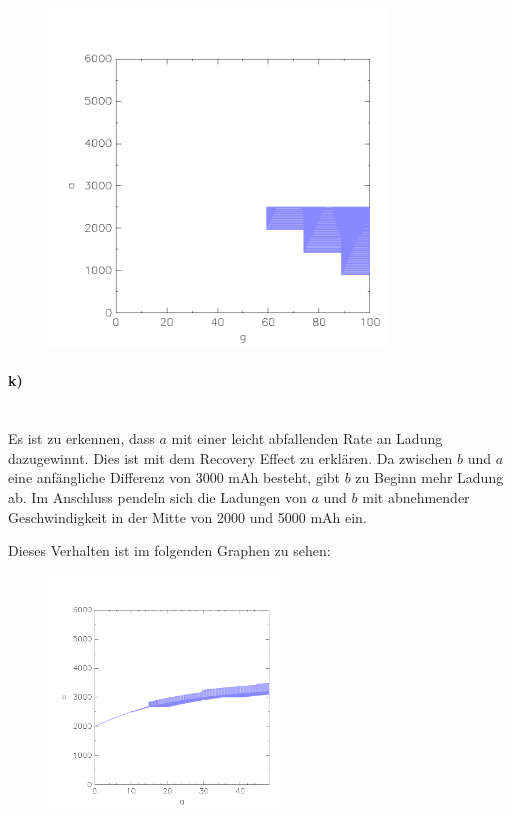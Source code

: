\begin{minipage}[t]{0.5\textwidth} 
	\begin{figure}[H]
		\centering
		\includegraphics[width=0.8\textwidth]{Aufgabe_j2).png}
	\end{figure}
\end{minipage}

\paragraph{k)}\mbox{} \\

Es ist zu erkennen, dass $a$ mit einer leicht abfallenden Rate an Ladung dazugewinnt. 
Dies ist mit dem Recovery Effect zu erklären. 
Da zwischen $b$ und $a$ eine anfängliche Differenz von 3000 mAh besteht, gibt $b$ zu Beginn mehr Ladung ab. Im Anschluss pendeln sich die Ladungen von $a$ und $b$ mit abnehmender Geschwindigkeit in der Mitte von 2000 und 5000 mAh ein.

Dieses Verhalten ist im folgenden Graphen zu sehen:

\begin{figure}[H]
	\centering
	\includegraphics[width=0.55\textwidth]{Aufgabe_k).png}
\end{figure}